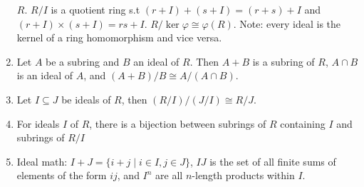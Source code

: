 \documentclass{article}
\begin{document}
\begin{enumerate}[1.]
        $R$. $R/I$ is a quotient ring s.t $(r+I)+(s+I) = (r+s)+I$ and
        $(r+I)\times(s+I) = rs + I$. $R/\ker \varphi \cong \varphi(R)$.
        Note: every ideal is the kernel of a ring homomorphism and vice
        versa.
    \item Let $A$ be a subring and $B$ an ideal of $R$. Then $A + B$ is a
        subring of $R$, $A \cap B$ is an ideal of $A$, and $(A+B)/B \cong
        A/(A \cap B)$.
    \item Let $I \subseteq J$ be ideals of $R$, then $(R/I)/(J/I) \cong
        R/J$.
    \item For ideals $I$ of $R$, there is a bijection between subrings of
    $R$ containing $I$ and subrings of $R/I$
    \item Ideal math: $I+J = \{i+j \mid i \in I, j \in J\}$, $IJ$ is the set
        of all finite sums of elements of the form $ij$, and $I^n$ are all
        $n$-length products within $I$.
\end{enumerate}
\end{document}
